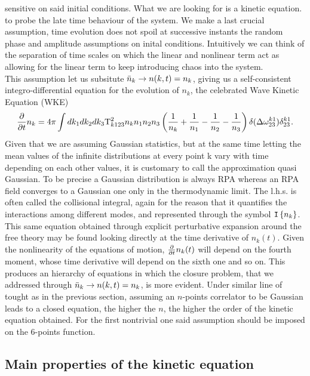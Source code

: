 sensitive on said initial conditions. What we are looking for is a kinetic equation. to probe the late time behaviour of the system.
We make a last crucial assumption, time evolution does not spoil at successive instants the random phase and amplitude 
assumptions on inital conditions. Intuitively we can think of the separation of time scales on which the linear and nonlinear term act as allowing for 
the linear term to keep introducing chaos into the system. \\
This assumption let us subsitute $\bar{n}_k \rightarrow n(k,t) = n_k$, giving us a self-consistent integro-differential equation for the evolution of $n_k$, the celebrated
Wave Kinetic Equation (WKE)
\begin{equation}
    \frac{\partial}{\partial t} n_k = 4 \pi\int dk_1 dk_2 dk_3 \\
    \mathrm{T}^2_{k123}n_kn_1n_2n_3
    \left(\frac{1}{n_k} + \frac{1}{n_1} - \frac{1}{n_2}- \frac{1}{n_3}  \right)
    \delta(\Delta{\omega}^{k1}_{23})\delta^{k1}_{23}.
    \label{kinetic}
\end{equation}
Given that we are assuming Gaussian statistics, but at the same time letting the mean values of the infinite distributions at every point k 
vary with time depending on each other values, it is customary to call the approximation quasi Gaussian. To be precise a Gaussian distribution is always
RPA whereas an RPA field converges to a Gaussian one only in the thermodynamic limit. The l.h.s. is often called the collisional integral, again 
for the reason that it quantifies the interactions among different modes, and represented through the symbol $\mathtt{I}\left\{n_k\right\}$. \\
This same equation obtained through explicit perturbative expansion around the free theory may be found looking directly at the time derivative of $n_k(t)$. 
Given the nonlinearity of the equations of motion, $\frac{\partial}{\partial t} n_k(t)$ will depend on the fourth moment, whose time derivative will depend on the sixth one and so on. 
This produces an hierarchy of equations in which the closure problem, that we addressed through $\bar{n}_k \rightarrow n(k,t) = n_k$, is more evident. Under similar line of tought
as in the previous section, assuming an $n$-points correlator to be Gaussian leads to a closed equation, the higher the $n$, the higher the order of the kinetic equation obtained.
For the first nontrivial one said assumption should be imposed on the 6-points function.\\

\subsection{Main properties of the kinetic equation}

